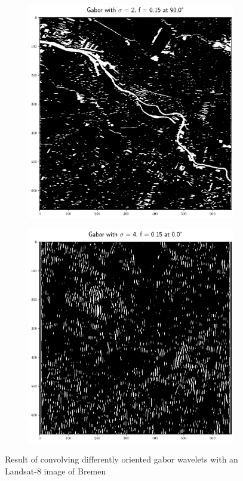\documentclass[12pt,a4paper, english,twoside]{scrartcl}
\begin{document}
\begin{figure}[!htbp]
     \begin{subfigure}[b]{0.45\textwidth}
         \centering
         \includegraphics[width=\textwidth]{img/Features_2_015_90.png}
         \label{fig:feat05}
     \end{subfigure}
     \hfill
     \begin{subfigure}[b]{0.45\textwidth}
         \centering
         \includegraphics[width=\textwidth]{img/Features_4_015_0.png}
         \label{fig:feat06}
     \end{subfigure}
        \caption{Result of convolving differently oriented gabor wavelets with an Landsat-8 image of Bremen}\label{fig:gaborExample}
    \end{figure}
\end{document}
